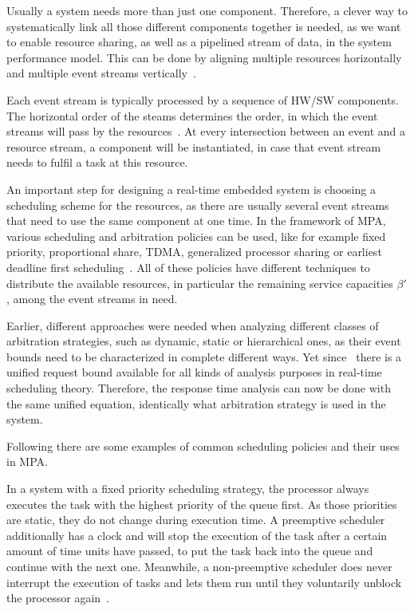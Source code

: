 \label{complexSystem}

Usually a system needs more than just one component.
Therefore, a clever way to systematically link all those different components together is needed, as
we want to enable resource sharing, as well as a pipelined stream of data, in the system performance model.
This can be done by aligning multiple resources horizontally and multiple event streams vertically~\cite{wan:06}.


Each event stream is typically processed by a sequence of HW/SW components.
The horizontal order of the steams determines the order, in which the event streams will pass by the resources~\cite{wan:06}.
At every intersection between an event and a resource stream, a component will be instantiated, in case that event stream needs to fulfil a task at this resource.

\label{scheduling}

An important step for designing a real-time embedded system is choosing a scheduling scheme for the resources,
as there are usually several event streams that need to use the same component at one time.
In the framework of MPA, various scheduling and arbitration policies can be used, like for example  
fixed priority, proportional share, TDMA, generalized processor sharing or earliest deadline first scheduling~\cite{wan:06}.
All of these policies have different techniques to distribute the available resources, in particular the remaining service capacities \(\beta'\), among the event streams in need.

Earlier, different approaches were needed when analyzing different classes of arbitration strategies, such as dynamic, static or hierarchical ones, as their event bounds need to be characterized in complete different ways.
Yet since~\cite{slo} there is a unified request bound available for all kinds of analysis purposes in real-time scheduling theory.
Therefore, the response time analysis can now be done with the same unified equation, identically what arbitration strategy is used in the system.

Following there are some examples of common scheduling policies and their uses in MPA.\


In a system with a fixed priority scheduling strategy, the processor always executes the task with the highest priority of the queue first. 
As those priorities are static, they do not change during execution time.
A preemptive scheduler additionally has a clock and will stop the execution of the task after a certain amount of time units have passed, to put the task back
into the queue and continue with the next one.
Meanwhile, a non-preemptive scheduler does never interrupt the execution of tasks and lets them run until they voluntarily unblock the processor again~\cite{mar}.

